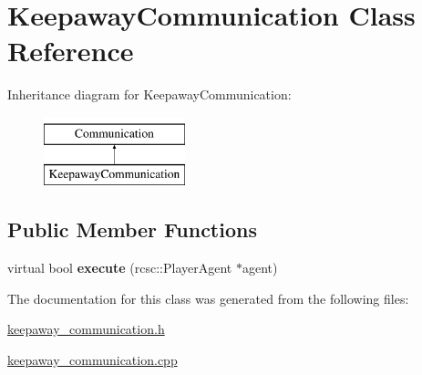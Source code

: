 \hypertarget{classKeepawayCommunication}{
\section{KeepawayCommunication Class Reference}
\label{classKeepawayCommunication}
}
Inheritance diagram for KeepawayCommunication:\begin{figure}[H]
\begin{center}
\leavevmode
\includegraphics[height=2.000000cm]{classKeepawayCommunication}
\end{center}
\end{figure}
\subsection*{Public Member Functions}
\begin{DoxyCompactItemize}
\item 
\hypertarget{classKeepawayCommunication_aa698dde27c63bfda7211f3c79bbc4024}{
virtual bool {\bfseries execute} (rcsc::PlayerAgent $\ast$agent)}
\label{classKeepawayCommunication_aa698dde27c63bfda7211f3c79bbc4024}

\end{DoxyCompactItemize}


The documentation for this class was generated from the following files:\begin{DoxyCompactItemize}
\item 
\hyperlink{keepaway__communication_8h}{keepaway\_\-communication.h}\item 
\hyperlink{keepaway__communication_8cpp}{keepaway\_\-communication.cpp}\end{DoxyCompactItemize}
